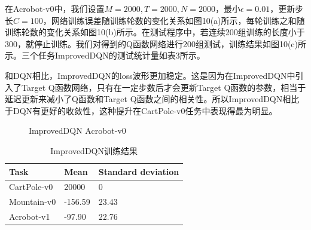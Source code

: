 \documentclass[a4paper,UTF8]{article}
\theoremstyle{definition}
\begin{document}
	在Acrobot-v0中，我们设置$M=2000,T=2000,N=2000$，最小$\epsilon=0.01$，更新步长$C=100$，网络训练误差随训练轮数的变化关系如图10(a)所示，每轮训练之和随训练轮数的变化关系如图10(b)所示。在测试程序中，若连续200组训练的长度小于300，就停止训练。我们对得到的Q函数网络进行200组测试，训练结果如图10(c)所示。三个任务ImprovedDQN的测试统计量如表3所示。

	和DQN相比，ImprovedDQN的loss波形更加稳定。这是因为在ImprovedDQN中引入了Target Q函数网络，只有在一定步数后才会更新Target Q函数的参数，相当于延迟更新来减小了Q函数和Target Q函数之间的相关性。所以ImprovedDQN相比于DQN有更好的收敛性，这种提升在CartPole-v0任务中表现得最为明显。

\begin{figure}[!h]
	\centering
	\caption{ImprovedDQN Acrobot-v0}

\end{figure}

\begin{table}[!h]
\caption{ImprovedDQN训练结果}  
\centering
\begin{tabular*}{8cm}{lll}  
\hline  
Task & Mean 
 &  Standard deviation\\  
\hline  
CartPole-v0  & 20000 & 0 \\  
Mountain-v0  & -156.59 & 23.43 \\ 
Acrobot-v1 	 & -97.90  & 22.76 \\ 
\hline  
\end{tabular*}  
\end{table} 
\end{document}
